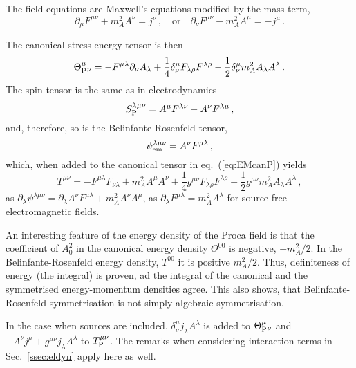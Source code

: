 \documentclass[a4paper,12pt]{article}
\begin{document}
The field equations are Maxwell's equations modified by the mass term,
\begin{equation}\label{eq:Proca4}
 \partial_\mu F^{\mu\nu} + m_A^2 A^\nu= j^\nu\,,\quad\text{or}\quad \partial_\nu F^{\mu\nu}-m_A^2 A^\mu=-j^\mu\,.
\end{equation}

The canonical stress-energy tensor is then
\begin{equation}\label{eq:EMcanP}
 \Theta^\mu_{\rm P}{}_\nu = -F^{\mu\lambda}\partial_\nu A_\lambda +\frac{1}{4}\delta^\mu_\nu F_{\lambda\rho}F^{\lambda\rho} - \frac{1}{2}\delta^\mu_\nu m_A^2 A_\lambda A^\lambda\,.
\end{equation}
The spin tensor is the same as in electrodynamics
\begin{equation}\label{eq:SpinAMP}
S^{\lambda\mu\nu}_{\rm P}  = A^\mu F^{\lambda\nu}-A^\nu F^{\lambda\mu}\,,
\end{equation}
and, therefore, so is the Belinfante-Rosenfeld tensor,
\begin{equation}\label{eq:BRsolP}
 \psi_{\rm em}^{\lambda\mu\nu} = A^\nu F^{\mu\lambda}\,,
\end{equation}
which, when added to the canonical tensor in eq.\ (\ref{eq:EMcanP}) yields
\begin{equation}\label{eq:SymmP}
 T^{\mu\nu} = -F^{\mu\lambda}F_{\nu\lambda}+m_A^2 A^\mu A^\nu +\frac{1}{4}g^{\mu\nu} F_{\lambda\rho}F^{\lambda\rho}- \frac{1}{2}g^{\mu\nu} m_A^2 A_\lambda A^\lambda\,,
\end{equation}
as $\partial_\lambda \psi^{\lambda\mu\nu} = \partial_\lambda A^\nu F^{\mu\lambda}+m_A^2 A^\nu A^\mu$, as $\partial_\lambda F^{\mu\lambda}=m_A^2 A^\lambda$ for source-free electromagnetic fields.

An interesting feature of the energy density of the Proca field is that the coefficient of $A_0^2$ in the canonical energy density $\Theta^{00}$ is negative, $-m_A^2/2$. In the Belinfante-Rosenfeld energy density, $T^{00}$ it is positive $m_A^2/2$. Thus, definiteness of energy (the integral) is proven, ad the integral of the canonical and the symmetrised energy-momentum densities agree. This also shows, that Belinfante-Rosenfeld symmetrisation is not simply algebraic symmetrisation.


In the case when sources are included, $\delta^\mu_\nu j_\lambda A^\lambda$ is added to $\Theta^{\mu}_{\rm P}{}_\nu$ and $-A^\nu j^\mu +g^{\mu\nu} j_\lambda A^\lambda$ to $T^{\mu\nu}_{\rm P}$. The remarks when considering interaction terms in Sec.\ \ref{ssec:eldyn} apply here as well.
\end{document}
